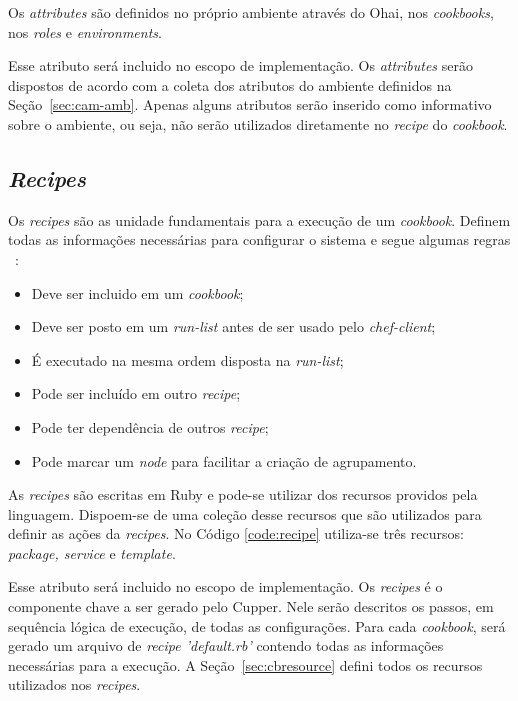 Os \textit{attributes} são definidos no próprio ambiente através do Ohai, nos \textit{cookbooks},
nos \textit{roles} e \textit{environments}.

Esse atributo será incluido no escopo de implementação. Os \textit{attributes} serão dispostos
de acordo com a coleta dos atributos do ambiente definidos na Seção~\ref{sec:cam-amb}.
Apenas alguns atributos serão inserido como informativo sobre o ambiente, ou seja,
não serão utilizados diretamente no \textit{recipe} do \textit{cookbook}.

\subsection{\textit{Recipes}}
\label{sec:lev-rec-rec}

Os \textit{recipes} são as unidade fundamentais para a execução de um \textit{cookbook}. Definem
todas as informações necessárias para configurar o sistema e segue algumas regras
~\cite{chefdoc:2016}:

\begin{itemize}
  \item Deve ser incluido em um \textit{cookbook};
  \item Deve ser posto em um \textit{run-list} antes de ser usado pelo \textit{chef-client};
  \item É executado na mesma ordem disposta na \textit{run-list};
  \item Pode ser incluído em outro \textit{recipe};
  \item Pode ter dependência de outros \textit{recipe};
  \item Pode marcar um \textit{node} para facilitar a criação de agrupamento.
\end{itemize}

As \textit{recipes} são escritas em Ruby e pode-se utilizar dos recursos providos
pela linguagem. Dispoem-se de uma coleção desse recursos que são utilizados
para definir as ações da \textit{recipes}. No Código \ref{code:recipe} utiliza-se
três recursos: \textit{package, service} e \textit{template}.

\begin{minipage}{.90\textwidth}
  \lstset{style=shell}
  
\end{minipage}

Esse atributo será incluido no escopo de implementação. Os \textit{recipes} é o componente chave a
ser gerado pelo Cupper. Nele serão descritos os passos, em sequência lógica de execução,
de todas as configurações. Para cada \textit{cookbook}, será gerado um arquivo de 
\textit{recipe 'default.rb'} contendo todas as informações necessárias para a execução.
A Seção~\ref{sec:cbresource} defini todos os recursos utilizados nos \textit{recipes}.

